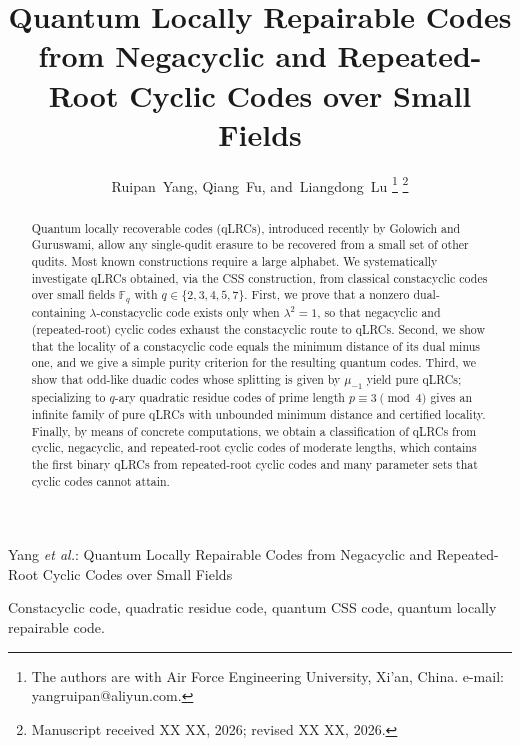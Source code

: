 \documentclass[journal,onecolumn]{IEEEtran}
\newcommand{\Ff}{{\mathbb F}}
\begin{document}
\title{Quantum Locally Repairable Codes from Negacyclic and Repeated-Root Cyclic Codes over Small Fields}

\author{Ruipan~Yang, Qiang~Fu, and~Liangdong~Lu%
\thanks{The authors are with Air Force Engineering University, Xi'an, China. e-mail: yangruipan@aliyun.com.}%
\thanks{Manuscript received XX XX, 2026; revised XX XX, 2026.}}

%
{Yang \MakeLowercase{\textit{et al.}}: Quantum Locally Repairable Codes from Negacyclic and Repeated-Root Cyclic Codes over Small Fields}

\maketitle

\begin{abstract}
Quantum locally recoverable codes (qLRCs), introduced recently by Golowich and Guruswami, allow any single-qudit erasure to be recovered from a small set of other qudits. Most known constructions require a large alphabet. We systematically investigate qLRCs obtained, via the CSS construction, from classical constacyclic codes over small fields $\Ff_q$ with $q\in\{2,3,4,5,7\}$. First, we prove that a nonzero dual-containing $\lambda$-constacyclic code exists only when $\lambda^2=1$, so that negacyclic and (repeated-root) cyclic codes exhaust the constacyclic route to qLRCs. Second, we show that the locality of a constacyclic code equals the minimum distance of its dual minus one, and we give a simple purity criterion for the resulting quantum codes. Third, we show that odd-like duadic codes whose splitting is given by $\mu_{-1}$ yield pure qLRCs; specializing to $q$-ary quadratic residue codes of prime length $p\equiv 3 \pmod 4$ gives an infinite family of pure qLRCs with unbounded minimum distance and certified locality. Finally, by means of concrete computations, we obtain a classification of qLRCs from cyclic, negacyclic, and repeated-root cyclic codes of moderate lengths, which contains the first binary qLRCs from repeated-root cyclic codes and many parameter sets that cyclic codes cannot attain.
\end{abstract}

\begin{IEEEkeywords}
Constacyclic code, quadratic residue code, quantum CSS code, quantum locally repairable code.
\end{IEEEkeywords}
\end{document}
